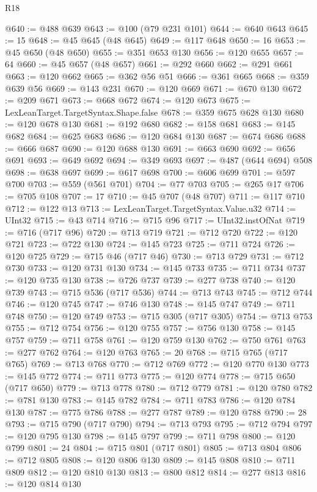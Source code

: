\begin{lexlean}{R18}
\begin{coremodule}
@640 := @488 @639
@643 := @100 (@79 @231 @101)
@644 := @640 @643
@645 := 15
@648 := @45 @645 (@48 @645)
@649 := @117 @648
@650 := 16
@653 := @45 @650 (@48 @650)
@655 := @351 @653 @130
@656 := @120 @655
@657 := 64
@660 := @45 @657 (@48 @657)
@661 := @292 @660
@662 := @291 @661
@663 := @120 @662
@665 := @362 @56 @51
@666 := @361 @665
@668 := @359 @639 @56
@669 := @143 @231
@670 := @120 @669
@671 := @670 @130
@672 := @209 @671
@673 := @668 @672
@674 := @120 @673
@675 := LexLeanTarget.TargetSyntax.Shape.false
@678 := @359 @675 @628 @130
@680 := @120 @678 @130
@681 := @192 @680
@682 := @158 @681
@683 := @145 @682
@684 := @625 @683
@686 := @120 @684 @130
@687 := @674 @686
@688 := @666 @687
@690 := @120 @688 @130
@691 := @663 @690
@692 := @656 @691
@693 := @649 @692
@694 := @349 @693
@697 := @487 (@644 @694) @508
@698 := @638 @697
@699 := @617 @698
@700 := @606 @699
@701 := @597 @700
@703 := @559 (@561 @701)
@704 := @77 @703
@705 := @265 @17
@706 := @705 @108
@707 := 17
@710 := @45 @707 (@48 @707)
@711 := @117 @710
@712 := @122 @13
@713 := LexLeanTarget.TargetSyntax.Value.u32
@714 := UInt32
@715 := @43 @714
@716 := @715 @96
@717 := UInt32.instOfNat
@719 := @716 (@717 @96)
@720 := @713 @719
@721 := @712 @720
@722 := @120 @721
@723 := @722 @130
@724 := @145 @723
@725 := @711 @724
@726 := @120 @725
@729 := @715 @46 (@717 @46)
@730 := @713 @729
@731 := @712 @730
@733 := @120 @731 @130
@734 := @145 @733
@735 := @711 @734
@737 := @120 @735 @130
@738 := @726 @737
@739 := @277 @738
@740 := @120 @739
@743 := @715 @536 (@717 @536)
@744 := @713 @743
@745 := @712 @744
@746 := @120 @745
@747 := @746 @130
@748 := @145 @747
@749 := @711 @748
@750 := @120 @749
@753 := @715 @305 (@717 @305)
@754 := @713 @753
@755 := @712 @754
@756 := @120 @755
@757 := @756 @130
@758 := @145 @757
@759 := @711 @758
@761 := @120 @759 @130
@762 := @750 @761
@763 := @277 @762
@764 := @120 @763
@765 := 20
@768 := @715 @765 (@717 @765)
@769 := @713 @768
@770 := @712 @769
@772 := @120 @770 @130
@773 := @145 @772
@774 := @711 @773
@775 := @120 @774
@778 := @715 @650 (@717 @650)
@779 := @713 @778
@780 := @712 @779
@781 := @120 @780
@782 := @781 @130
@783 := @145 @782
@784 := @711 @783
@786 := @120 @784 @130
@787 := @775 @786
@788 := @277 @787
@789 := @120 @788
@790 := 28
@793 := @715 @790 (@717 @790)
@794 := @713 @793
@795 := @712 @794
@797 := @120 @795 @130
@798 := @145 @797
@799 := @711 @798
@800 := @120 @799
@801 := 24
@804 := @715 @801 (@717 @801)
@805 := @713 @804
@806 := @712 @805
@808 := @120 @806 @130
@809 := @145 @808
@810 := @711 @809
@812 := @120 @810 @130
@813 := @800 @812
@814 := @277 @813
@816 := @120 @814 @130

\end{coremodule}
\end{lexlean}
